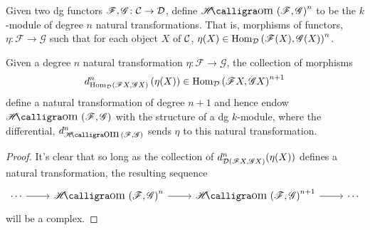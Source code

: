 \documentclass[dissertation.tex]{subfiles}
\begin{document}
\begin{defn}
  Given two dg functors $\mathscr{F},\mathscr{G} \colon \mathcal{C} \rightarrow \mathcal{D}$, define $\SHom{\mathscr{F},\mathscr{G}}^n$ to be the $k$-module of degree $n$ natural transformations.
  That is, morphisms of functors, $\eta \colon \mathscr{F} \rightarrow \mathscr{G}$ such that for each object $X$ of $\mathcal{C}$, $\eta(X) \in \operatorname{Hom}_{\mathcal{D}}\left(\mathscr{F}(X),\mathscr{G}(X)\right)^n$.
\end{defn}

\begin{prop}
  Given a degree $n$ natural transformation $\eta \colon \mathscr{F} \rightarrow \mathscr{G}$, the collection of morphisms
  $$d^n_{\operatorname{Hom}_{\mathcal{D}}\left(\mathscr{F}X, \mathscr{G}X\right)}\left( \eta(X) \right) \in \operatorname{Hom}_{\mathcal{D}}\left(\mathscr{F}X, \mathscr{G}X\right)^{n+1}$$
  define a natural transformation of degree $n + 1$ and hence endow $\SHom{\mathscr{F},\mathscr{G}}$ with the structure of a dg $k$-module, where the differential, $d_{\SHom{\mathscr{F},\mathscr{G}}}^n$ sends $\eta$ to this natural transformation.
  
  \begin{proof}
    It's clear that so long as the collection of $d^n_{\mathcal{D}(\mathscr{F} X, \mathscr{G} X)}(\eta(X))$ defines a natural transformation, the resulting sequence
    $$\begin{tikzcd}
      \cdots \arrow{r} & \SHom{\F, \G}^n \arrow{r} & \SHom{\F,\G}^{n+1} \arrow{r} & \cdots
    \end{tikzcd}$$
    will be a complex.
    

\end{proof}
\end{prop}
\end{document}
